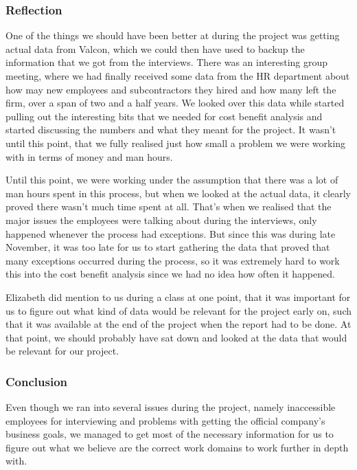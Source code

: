 \subsubsection{Reflection}
One of the things we should have been better at during the project was getting actual data from Valcon, which we could then have used to backup the information that we got from the interviews. There was an interesting group meeting, where we had finally received some data from the HR department about how may new employees and subcontractors they hired and how many left the firm, over a span of two and a half years. We looked over this data while started pulling out the interesting bits that we needed for cost benefit analysis and started discussing the numbers and what they meant for the project. It wasn't until this point, that we fully realised just how small a problem we were working with in terms of money and man hours. 

Until this point, we were working under the assumption that there was a lot of man hours spent in this process, but when we looked at the actual data, it clearly proved there wasn't much time spent at all. That's when we realised that the major issues the employees were talking about during the interviews, only happened whenever the process had exceptions. But since this was during late November, it was too late for us to start gathering the data that proved that many exceptions occurred during the process, so it was extremely hard to work this into the cost benefit analysis since we had no idea how often it happened.

Elizabeth did mention to us during a class at one point, that it was important for us to figure out what kind of data would be relevant for the project early on, such that it was available at the end of the project when the report had to be done. At that point, we should probably have sat down and looked at the data that would be relevant for our project.

\subsubsection{Conclusion}
Even though we ran into several issues during the project, namely inaccessible employees for interviewing and problems with getting the official company’s business goals, we managed to get most of the necessary information for us to figure out what we believe are the correct work domains to work further in depth with.
